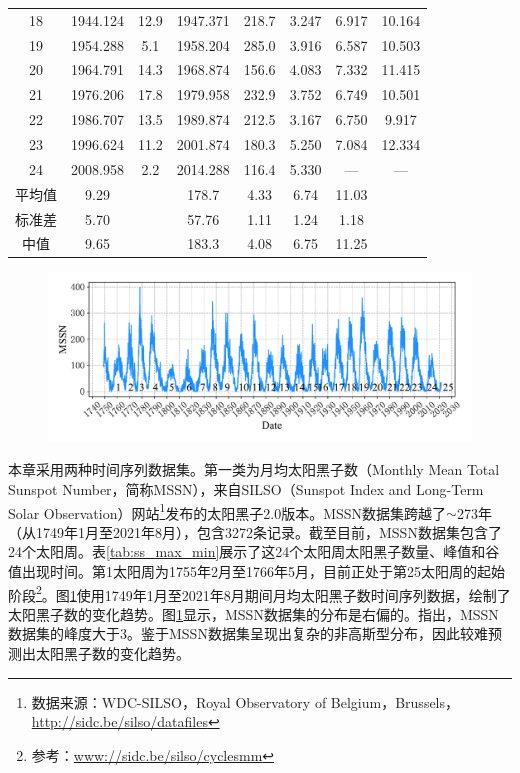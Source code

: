 \begin{table}[!htbp]
\begin{tabular}{cccccccc}
    18 & 1944.124 & 12.9 & 1947.371 & 218.7 & 3.247 & 6.917 & 10.164 \\
    19 & 1954.288 & 5.1 & 1958.204 & 285.0 & 3.916 & 6.587 & 10.503 \\
    20 & 1964.791 & 14.3 & 1968.874 & 156.6 & 4.083 & 7.332 & 11.415 \\
    21 & 1976.206 & 17.8 & 1979.958 & 232.9 & 3.752 & 6.749 & 10.501 \\
    22 & 1986.707 & 13.5 & 1989.874 & 212.5 & 3.167 & 6.750 & 9.917 \\
    23 & 1996.624 & 11.2 & 2001.874 & 180.3 & 5.250 & 7.084 & 12.334  \\
    24 & 2008.958 & 2.2 & 2014.288 & 116.4 & 5.330 & — & —  \\
    平均值 & 9.29 &  & 178.7 & 4.33 & 6.74 & 11.03  \\
    标准差 & 5.70 &  & 57.76 & 1.11 & 1.24 & 1.18 \\
    中值 & 9.65 &  & 183.3 & 4.08 & 6.75 & 11.25 \\
    \bottomrule
  \end{tabular}
\end{table}

\begin{figure}[!htbp]
  \centering
  \includegraphics[width=\textwidth]{Img/chap3_ss/ss_number_series.pdf}
  \vspace{-1.4cm}
  \label{fig:ss_number_series}
\end{figure}

本章采用两种时间序列数据集。第一类为月均太阳黑子数（Monthly Mean Total Sunspot Number，简称MSSN），来自SILSO（Sunspot Index and Long-Term Solar Observation）网站\footnote{数据来源：WDC-SILSO，Royal Observatory of Belgium，Brussels，\href{http://sidc.be/silso/datafiles}{http://sidc.be/silso/datafiles}}发布的太阳黑子2.0版本。MSSN数据集跨越了$\sim$273年（从1749年1月至2021年8月），包含3272条记录。截至目前，MSSN数据集包含了24个太阳周。表\ref{tab:ss_max_min}展示了这24个太阳周太阳黑子数量、峰值和谷值出现时间。第1太阳周为1755年2月至1766年5月，目前正处于第25太阳周的起始阶段\footnote{参考：\href{www://sidc.be/silso/cyclesmm}{www://sidc.be/silso/cyclesmm}}。图\ref{fig:ss_number_series}使用1749年1月至2021年8月期间月均太阳黑子数时间序列数据，绘制了太阳黑子数的变化趋势。图\ref{fig:ss_number_series}显示，MSSN数据集的分布是右偏的。\citet{panigrahi2021forecasting}指出，MSSN数据集的峰度大于3。鉴于MSSN数据集呈现出复杂的非高斯型分布，因此较难预测出太阳黑子数的变化趋势。

